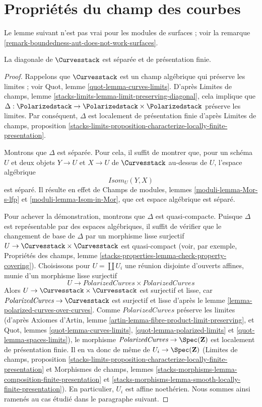\section{Propriétés du champ des courbes}
\label{section-properties}

\noindent
Le lemme suivant n'est pas vrai pour les modules de surfaces ; voir
la remarque \ref{remark-boundedness-aut-does-not-work-surfaces}.

\begin{lemma}
\label{lemma-curves-diagonal-separated-fp}
La diagonale de $\Curvesstack$ est séparée
et de présentation finie.
\end{lemma}

\begin{proof}
Rappelons que $\Curvesstack$ est un champ algébrique qui préserve les limites ;
voir Quot, lemme \ref{quot-lemma-curves-limits}.
D'après Limites de champs, lemme
\ref{stacks-limits-lemma-limit-preserving-diagonal}, cela implique que
$\Delta : \Polarizedstack \to \Polarizedstack \times \Polarizedstack$
préserve les limites. Par conséquent, $\Delta$ est localement de présentation
finie d'après Limites de champs, proposition
\ref{stacks-limits-proposition-characterize-locally-finite-presentation}.

\medskip\noindent
Montrons que $\Delta$ est séparée. Pour cela, il suffit de montrer que,
pour un schéma $U$ et deux objets $Y \to U$ et $X \to U$ de
$\Curvesstack$ au-dessus de $U$, l'espace algébrique
$$
\mathit{Isom}_U(Y, X)
$$
est séparé. Il résulte en effet de Champs de modules, lemmes
\ref{moduli-lemma-Mor-s-lfp} et
\ref{moduli-lemma-Isom-in-Mor}, que cet espace
algébrique est séparé.

\medskip\noindent
Pour achever la démonstration, montrons que $\Delta$ est quasi-compacte.
Puisque $\Delta$ est représentable par des espaces algébriques, il suffit
de vérifier que le changement de base de $\Delta$ par un morphisme lisse
surjectif $U \to \Curvesstack \times \Curvesstack$ est quasi-compact
(voir, par exemple, Propriétés des champs, lemme
\ref{stacks-properties-lemma-check-property-covering}).
Choisissons pour $U = \coprod U_i$ une réunion disjointe d'ouverts affines,
munie d'un morphisme lisse surjectif
$$
U \longrightarrow
\textit{PolarizedCurves} \times \textit{PolarizedCurves}
$$
Alors $U \to \Curvesstack \times \Curvesstack$ est surjectif
et lisse, car $\textit{PolarizedCurves} \to \Curvesstack$
est surjectif et lisse d'après le lemme
\ref{lemma-polarized-curves-over-curves}.
Comme $\textit{PolarizedCurves}$ préserve les limites
(d'après Axiomes d'Artin, lemme
\ref{artin-lemma-fibre-product-limit-preserving},
et Quot, lemmes \ref{quot-lemma-curves-limits},
\ref{quot-lemma-polarized-limits} et
\ref{quot-lemma-spaces-limits}), le morphisme
$\textit{PolarizedCurves} \to \Spec(\mathbf{Z})$ est localement de
présentation finie. Il en va donc de même de $U_i \to \Spec(\mathbf{Z})$
(Limites de champs, proposition
\ref{stacks-limits-proposition-characterize-locally-finite-presentation}
et Morphismes de champs, lemmes
\ref{stacks-morphisms-lemma-composition-finite-presentation} et
\ref{stacks-morphisms-lemma-smooth-locally-finite-presentation}).
En particulier, $U_i$ est affine noethérien. Nous sommes ainsi ramenés
au cas étudié dans le paragraphe suivant.


\end{proof}

